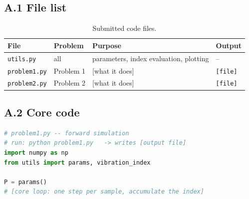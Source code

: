 
\subsection*{A.1 File list}

\begin{table}[htbp]
  \centering
  \caption{Submitted code files.}
  \label{tab:codefiles}
  \footnotesize
  \begin{tabular}{@{}p{}p{}p{}p{}@{}}
    \toprule
    File & Problem & Purpose & Output \\
    \midrule
    \texttt{utils.py}    & all       & parameters, index evaluation, plotting & -- \\
    \texttt{problem1.py} & Problem 1 & [what it does]                         & \texttt{[file]} \\
    \texttt{problem2.py} & Problem 2 & [what it does]                         & \texttt{[file]} \\
    \bottomrule
  \end{tabular}
\end{table}

\subsection*{A.2 Core code}

\begin{lstlisting}[language=Python]
# problem1.py -- forward simulation
# run: python problem1.py   -> writes [output file]
import numpy as np
from utils import params, vibration_index

P = params()
# [core loop: one step per sample, accumulate the index]
\end{lstlisting}

